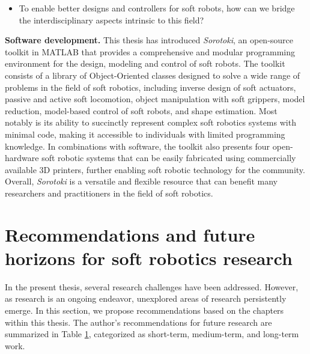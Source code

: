 \begin{itemize}
  \item{To enable better designs and controllers for soft robots, how can we bridge the interdisciplinary aspects intrinsic to this field?}
\end{itemize}

\noindent \textbf{Software development.} This thesis has introduced \textit{Sorotoki}, an open-source toolkit in MATLAB that provides a comprehensive and modular programming environment for the design, modeling and control of soft robots. The toolkit consists of a library of Object-Oriented classes designed to solve a wide range of problems in the field of soft robotics, including inverse design of soft actuators, passive and active soft locomotion, object manipulation with soft grippers, model reduction, model-based control of soft robots, and shape estimation. Most notably is its ability to succinctly represent complex soft robotics systems with minimal code, making it accessible to individuals with limited programming knowledge. In combinations with software, the toolkit also presents four open-hardware soft robotic systems that can be easily fabricated using commercially available 3D printers, further enabling soft robotic technology for the community. Overall, \textit{Sorotoki} is a versatile and flexible resource that can benefit many researchers and practitioners in the field of soft robotics.

\section{Recommendations and future horizons for soft robotics research}
In the present thesis, several research challenges have been addressed. However, as research is an ongoing endeavor, unexplored areas of research persistently emerge. In this section, we propose recommendations based on the chapters within this thesis. The author's recommendations for future research are summarized in Table \ref{}, categorized as short-term, medium-term, and long-term work.

